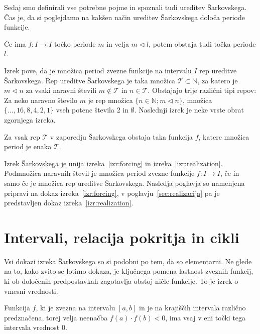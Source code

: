 \documentclass[mat2]{fmfdelo}
\newcommand{\N}{\mathbb N}
\begin{document}
Sedaj smo definirali vse potrebne pojme in spoznali tudi ureditev Šarkovskega. Čas je, da si poglejdamo na kakšen način ureditev Šarkovskega določa periode funkcije.

\begin{izrek}\label{izr:forcing}
Če ima $f : I \to I$ točko periode $m$ in velja $ m \triangleleft l$, potem obstaja tudi točka periode $l$.
\end{izrek}
Izrek pove, da je množica period zvezne funkcije na intervalu $I$ rep ureditve Šarkovskega. Rep ureditve Šarkovskega je taka množica $\mathcal{T} \subset \N$, za katero je $m \triangleleft n$ za  vsaki naravni števili $m \notin \mathcal{T}$ in $n \in \mathcal{T}$. Obstajajo trije različni tipi repov:  Za neko naravno število $m$ je rep množica $\{n \in \N; m \triangleleft n\}$, množica $\{\dots, 16, 8, 4, 2, 1\}$ vseh potenc števila 2 in $\emptyset$.
Naslednji izrek je neke vrste obrat zgornjega izreka.

\begin{izrek}\label{izr:realization}
Za vsak rep $\mathcal{T}$ v zaporedju Šarkovskega obstaja taka funkcija $f$, katere množica period je enaka $\mathcal{T}$.
\end{izrek}

Izrek Šarkovskega je unija izreka~\ref{izr:forcing} in izreka~\ref{izr:realization}. Podmnožica naravnih števil je množica period zvezne funkcije $f:I \to I$, če in samo če je množica rep ureditve Šarkovskega. Nasledja poglavja so namenjena pripravi na dokaz izreka~\ref{izr:forcing}, v poglavju~\ref{sec:realizacija} pa je predstavljen dokaz izreka~\ref{izr:realization}.
\section{Intervali, relacija pokritja in cikli}
Vsi dokazi izreka Šarkovskega so si podobni po tem, da so elementarni. Ne glede na to, kako zvito se lotimo dokaza, je ključnega pomena lastnost zveznih funkcij, ki ob določenih predpostavkah zagotavlja obstoj ničle funkcije. To je izrek o vmesni vrednosti.

\begin{izrek}\label{izr:iovv}
Funkcija $f$, ki je zvezna na intervalu $[a, b]$ in je na krajiščih intervala različno predznačena, torej velja neenačba $f(a)\cdot f(b) < 0$, ima vsaj v eni točki tega intervala vrednost 0.
\end{izrek}
\end{document}
